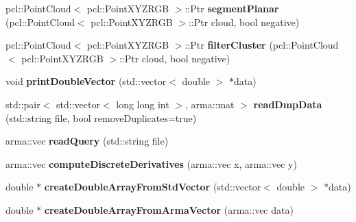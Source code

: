 \begin{DoxyCompactItemize}
\item 
pcl\+::\+Point\+Cloud$<$ pcl\+::\+Point\+X\+Y\+Z\+R\+GB $>$\+::Ptr {\bfseries segment\+Planar} (pcl\+::\+Point\+Cloud$<$ pcl\+::\+Point\+X\+Y\+Z\+R\+GB $>$\+::Ptr cloud, bool negative)\hypertarget{namespacekukadu_a120438eee5a477e31352ded69063e7cc}{}\label{namespacekukadu_a120438eee5a477e31352ded69063e7cc}

\item 
pcl\+::\+Point\+Cloud$<$ pcl\+::\+Point\+X\+Y\+Z\+R\+GB $>$\+::Ptr {\bfseries filter\+Cluster} (pcl\+::\+Point\+Cloud$<$ pcl\+::\+Point\+X\+Y\+Z\+R\+GB $>$\+::Ptr cloud, bool negative)\hypertarget{namespacekukadu_a77632af68c3866b398e33681bd047b91}{}\label{namespacekukadu_a77632af68c3866b398e33681bd047b91}

\item 
void {\bfseries print\+Double\+Vector} (std\+::vector$<$ double $>$ $\ast$data)\hypertarget{namespacekukadu_a1de8efd2d11c3184e95d80f0652ec4b3}{}\label{namespacekukadu_a1de8efd2d11c3184e95d80f0652ec4b3}

\item 
std\+::pair$<$ std\+::vector$<$ long long int $>$, arma\+::mat $>$ {\bfseries read\+Dmp\+Data} (std\+::string file, bool remove\+Duplicates=true)\hypertarget{namespacekukadu_a1ce6010e73208a8318fd7bf780533fcb}{}\label{namespacekukadu_a1ce6010e73208a8318fd7bf780533fcb}

\item 
arma\+::vec {\bfseries read\+Query} (std\+::string file)\hypertarget{namespacekukadu_a6045b5e6eb7c8f49a0cab0e6fb09c129}{}\label{namespacekukadu_a6045b5e6eb7c8f49a0cab0e6fb09c129}

\item 
arma\+::vec {\bfseries compute\+Discrete\+Derivatives} (arma\+::vec x, arma\+::vec y)\hypertarget{namespacekukadu_a624f93fab797148406ed6fc8fb3b27aa}{}\label{namespacekukadu_a624f93fab797148406ed6fc8fb3b27aa}

\item 
double $\ast$ {\bfseries create\+Double\+Array\+From\+Std\+Vector} (std\+::vector$<$ double $>$ $\ast$data)\hypertarget{namespacekukadu_a2508a08633bd3cfe5443abeedc7b3736}{}\label{namespacekukadu_a2508a08633bd3cfe5443abeedc7b3736}

\item 
double $\ast$ {\bfseries create\+Double\+Array\+From\+Arma\+Vector} (arma\+::vec data)\hypertarget{namespacekukadu_adb8d490dd8c2cccd6d17aeefbc678b58}{}\label{namespacekukadu_adb8d490dd8c2cccd6d17aeefbc678b58}


\end{DoxyCompactItemize}
